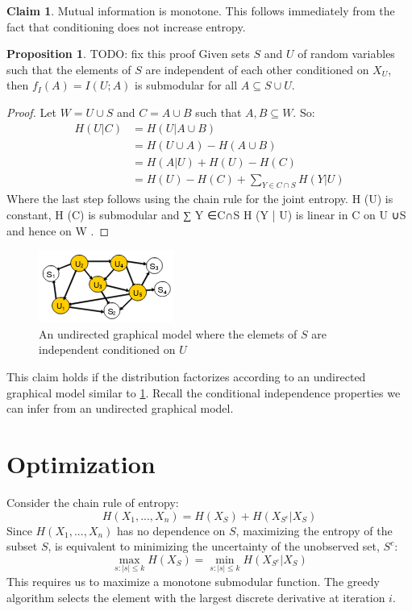 \documentclass[twoside]{article}
\theoremstyle{definition}
\newtheorem{proposition}[theorem]{Proposition}
\newtheorem{claim}[theorem]{Claim}
\begin{document}
\begin{claim}
  Mutual information is monotone. This follows immediately from
  the fact that conditioning does not increase entropy.
\end{claim}

\begin{proposition}
  TODO: fix this proof
  Given sets $S$ and $U$ of random variables such that the elements of
  $S$ are independent of each other conditioned on $X_U$, then $f_I(A) = I(U;
  A)$
  is submodular for all $A \subseteq S \cup U$.
\end{proposition}

\begin{proof}
  Let $W = U \cup S$ and $C = A \cup B$ such that $A, B \subseteq W$. So:
  \begin{align*}
    H (U | C) &= H (U |A \cup B) \\
              &= H (U \cup A) - H(A \cup B) \\
              &= H (A|U)+ H (U) - H (C) \\
              &= H (U) - H (C) + \sum_{Y \in C \cap S} H (Y |U)
  \end{align*}
  Where the last step follows using the chain rule for the joint entropy. H (U) is constant, H (C) is submodular and ∑ Y ∈C∩S H (Y | U) is linear in C on U ∪S and hence on W .
\end{proof}

\begin{figure}[h]
  \centering
  \includegraphics[scale=0.8]{cond_ind.png}
  \caption{An undirected graphical model where the elemets of $S$ are
    independent conditioned on $U$}
  \label{fig:ugm}
\end{figure}

This claim holds if the distribution factorizes according to an
undirected graphical model similar to \ref{fig:ugm}. Recall the conditional
independence properties we can infer from an undirected graphical
model.

\section{Optimization}

Consider the chain rule of entropy:
$$H(X_1, ..., X_n) = H(X_S) + H(X_{S^c} | X_S)$$
Since $H(X_1, ..., X_n)$ has no dependence on $S$, maximizing the
entropy of the subset $S$, is equivalent to minimizing the
uncertainty of the unobserved set, $S^c$:
$$\max_{s: |s| \leq k} H(X_S) = \min_{s: |s| \leq k} H(X_{S^c} |
X_S)$$
This requires us to maximize a monotone submodular function. The
greedy algorithm selects the element with the largest discrete
derivative at iteration $i$.
\end{document}
